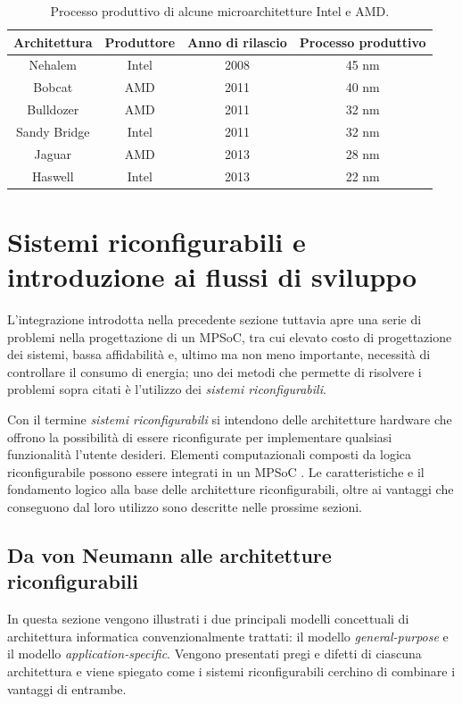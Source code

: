 \begin{table}[t]
  \begin{center}
    \begin{tabular}{|c|c|c|c|}
      \hline
      \textbf{Architettura} & \textbf{Produttore} & \textbf{Anno di rilascio} & \textbf{Processo produttivo}\\
      \hline
      Nehalem & Intel & 2008 & 45 nm\\
      \hline
      Bobcat & AMD & 2011 & 40 nm\\
      \hline
      Bulldozer & AMD & 2011 & 32 nm\\
      \hline
      Sandy Bridge & Intel & 2011 & 32 nm\\
      \hline
      Jaguar & AMD & 2013 & 28 nm\\
      \hline
      Haswell & Intel & 2013 & 22 nm\\
      \hline
    \end{tabular}
    \caption{Processo produttivo di alcune microarchitetture Intel
      \cite{IntelTransistor, IntelsVision} e AMD.}
    \label{tab:processoProduttivo}
  \end{center}
\end{table}



\section{Sistemi riconfigurabili e introduzione ai flussi di sviluppo}
\label{sec:reconfComp}
L'integrazione introdotta nella precedente sezione tuttavia apre una serie di problemi nella progettazione
di un \ac{MPSoC}, tra cui elevato costo di progettazione dei sistemi, bassa affidabilità e, ultimo
ma non meno importante, necessità di controllare il consumo di energia; uno dei metodi che 
permette di risolvere i problemi sopra citati  \`e l'utilizzo dei \emph{sistemi riconfigurabili}.

Con il termine \emph{sistemi riconfigurabili} si intendono delle architetture hardware che 
offrono la possibilità di essere riconfigurate per implementare qualsiasi funzionalità 
l'utente desideri. Elementi computazionali composti da logica riconfigurabile possono essere integrati in un
\ac{MPSoC} \cite{EmbeddedReconfigurableArchitectures}. Le caratteristiche e il fondamento logico alla
base delle architetture riconfigurabili,
oltre ai vantaggi che conseguono dal loro utilizzo sono descritte nelle prossime sezioni.

\subsection{Da von Neumann alle architetture riconfigurabili}
\label{subsec:cambioParadigma}
In questa sezione vengono illustrati i due principali modelli concettuali di architettura
informatica convenzionalmente trattati: il modello \emph{general-purpose} e il modello
\emph{application-specific}. Vengono presentati pregi e difetti di ciascuna architettura
e viene spiegato come i sistemi riconfigurabili cerchino di combinare i vantaggi di
entrambe.

